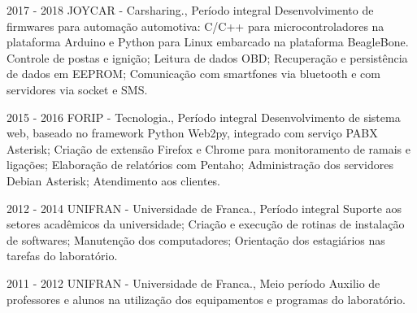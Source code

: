

{2017 - 2018\space\space\space\space}
{JOYCAR - Carsharing., Período integral}
{Desenvolvimento de firmwares para automação automotiva: C/C++ para
microcontroladores na plataforma Arduino e Python para Linux embarcado na
plataforma BeagleBone. Controle de postas e ignição; Leitura de dados OBD;
Recuperação e persistência de dados em EEPROM; Comunicação com smartfones via
bluetooth e com servidores via socket e SMS.}
\sepspace


{2015 - 2016\space\space\space\space}
{FORIP - Tecnologia., Período integral}
{Desenvolvimento de sistema web, baseado no framework Python
Web2py, integrado com serviço PABX Asterisk; Criação de extensão Firefox e
Chrome para monitoramento de ramais e ligações; Elaboração de relatórios com
Pentaho; Administração dos servidores Debian Asterisk; Atendimento aos
clientes.}
\sepspace




{2012 - 2014\space\space\space\space\space}
{UNIFRAN - Universidade de Franca., Período integral}
{Suporte aos setores acadêmicos da universidade; Criação e execução de rotinas
de instalação de softwares; Manutenção dos computadores; Orientação dos
estagiários nas tarefas do laboratório.}
\sepspace


{2011 - 2012\space\space\space\space\space}
{UNIFRAN - Universidade de Franca., Meio período}
{Auxilio de professores e alunos na utilização dos equipamentos e programas do
laboratório.}
